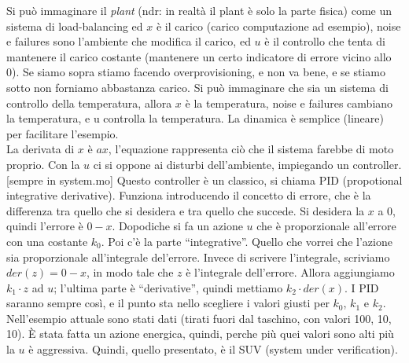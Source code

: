 \documentclass[a4paper, 11pt]{article}
\begin{document}
Si può immaginare il \emph{plant} (ndr: in realtà il plant è solo la parte fisica) come un sistema di load-balancing ed $x$ è il carico (carico computazione ad esempio), noise e failures sono l'ambiente che modifica il carico, ed $u$ è il controllo che tenta di mantenere il carico costante (mantenere un certo indicatore di errore vicino allo 0). Se siamo sopra stiamo facendo overprovisioning, e non va bene, e se stiamo sotto non forniamo abbastanza carico. Si può immaginare che sia un sistema di controllo della temperatura, allora $x$ è la temperatura, noise e failures cambiano la temperatura, e u controlla la temperatura. La dinamica è semplice (lineare) per facilitare l'esempio.\\
La derivata di $x$ è $ax$, l'equazione rappresenta ciò che il sistema farebbe di moto proprio. Con la $u$ ci si oppone ai disturbi dell'ambiente, impiegando un controller. [sempre in system.mo] Questo controller è un classico, si chiama PID (propotional integrative derivative). Funziona introducendo il concetto di errore, che è la differenza tra quello che si desidera e tra quello che succede. Si desidera la $x$ a 0, quindi l'errore è $0 - x$. Dopodiche si fa un azione $u$ che è proporzionale all'errore con una costante $k_0$. Poi c'è la parte ``integrative''. Quello che vorrei che l'azione sia proporzionale all'integrale del'errore. Invece di scrivere l'integrale, scriviamo $der(z) = 0 - x$, in modo tale che $z$ è l'integrale dell'errore. Allora aggiungiamo $k_1 \cdot z$ ad $u$; l'ultima parte è ``derivative'', quindi mettiamo $k_2 \cdot der(x)$. I PID saranno sempre così, e il punto sta nello scegliere i valori giusti per $k_0$, $k_1$ e $k_2$. Nell'esempio attuale sono stati dati (tirati fuori dal taschino, con valori 100, 10, 10). \`E stata fatta un azione energica, quindi, perche più quei valori sono alti più la $u$ è aggressiva. Quindi, quello presentato, è il SUV (system under verification).\\
\end{document}
